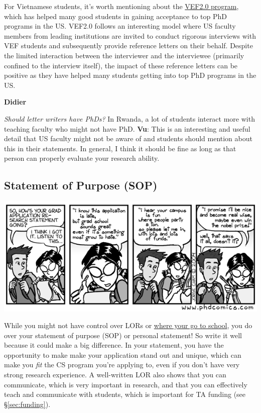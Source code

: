 \documentclass[11pt]{article}
\newenvironment{commentbox}[1][]{
\small
    \begin{mybox}
    {\small \textbf{#1}}
 }{
   \end{mybox}
}
\begin{document}
For Vietnamese students, it's worth mentioning about the \href{https://vef2.org/}{VEF2.0 program}, which has helped many good students in gaining acceptance to top PhD programs in the US. VEF2.0 follows an interesting model where US faculty members from leading institutions are invited to conduct rigorous interviews with VEF students and subsequently provide reference letters on their behalf. Despite the limited interaction between the interviewer and the interviewee (primarily confined to the interview itself), the impact of these reference letters can be positive as they have helped many students getting into top PhD programs in the US.

\begin{commentbox}[Didier]
\emph{Should letter writers have PhDs?}  In Rwanda, a lot of students interact more with teaching faculty who might not have PhD.
\tcblower
\textbf{Vu}: This is an interesting and useful detail that US faculty might not be aware of and students should mention about this in their statements. In general, I think it should be fine as long as that person can properly evaluate your research ability. 
\end{commentbox}

\subsection{Statement of Purpose (SOP)}\label{sec:research-statement}


    \begin{center}
      \includegraphics[scale=0.5]{c2.png}
    \end{center}

While you might not have control over LORs or \hyperref[sec:your-school]{where your go to school}, you do over your
statement of purpose (SOP) or personal statement! So write it well because it could make a big difference.
In your statement, you have the opportunity to make  make your application stand out and unique, which can make you \emph{fit} the CS program you're applying to, even if you don't have very strong research experience.
A well-written LOR also shows that you can communicate, which is very important in research, and that you can effectively teach and communicate with students, which is important for TA funding (see \S\ref{sec:funding}).
\end{document}
